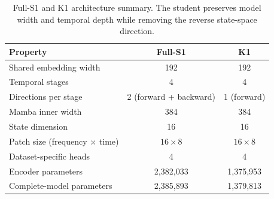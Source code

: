\begin{table}[t]
\centering
\caption{Full-S1 and K1 architecture summary. The student preserves model width and temporal depth while removing the reverse state-space direction.}
\label{tab:model_architecture}
\small
\begin{tabular}{lcc}
\toprule
Property & Full-S1 & K1 \\
\midrule
Shared embedding width & 192 & 192 \\
Temporal stages & 4 & 4 \\
Directions per stage & 2 (forward + backward) & 1 (forward) \\
Mamba inner width & 384 & 384 \\
State dimension & 16 & 16 \\
Patch size (frequency $\times$ time) & $16\times8$ & $16\times8$ \\
Dataset-specific heads & 4 & 4 \\
Encoder parameters & 2,382,033 & 1,375,953 \\
Complete-model parameters & 2,385,893 & 1,379,813 \\
\bottomrule
\end{tabular}
\end{table}

